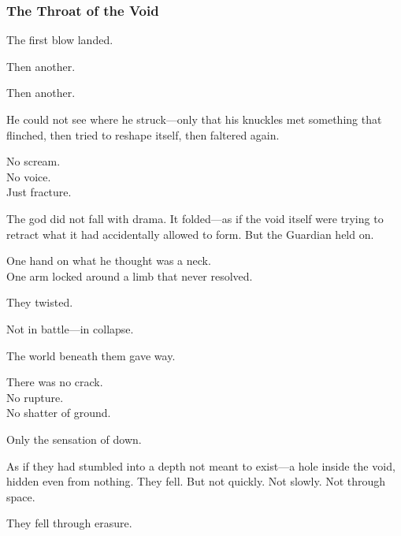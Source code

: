 \documentclass[12pt]{article}
\begin{document}
\dotfill

\subsubsection*{The Throat of the Void}

The first blow landed.

\vspace{0.5em}
Then another.

\vspace{0.5em}
Then another.

\vspace{0.5em}
He could not see where he struck---only that his knuckles met something that flinched, then tried to reshape itself, then faltered again.

\vspace{0.5em}
No scream.\\
No voice.\\
Just fracture.

\vspace{0.5em}
The god did not fall with drama. It folded---as if the void itself were trying to retract what it had accidentally allowed to form. But the Guardian held on.

\vspace{0.5em}
One hand on what he thought was a neck.\\
One arm locked around a limb that never resolved.

\vspace{0.5em}
They twisted.

\vspace{0.5em}
Not in battle---in collapse.

\vspace{0.5em}
The world beneath them gave way.

\vspace{0.5em}
There was no crack.\\
No rupture.\\
No shatter of ground.

\vspace{0.5em}
Only the sensation of down.

\vspace{0.5em}
As if they had stumbled into a depth not meant to exist---a hole inside the void, hidden even from nothing. They fell. But not quickly. Not slowly. Not through space.

\vspace{0.5em}
They fell through erasure.
\end{document}
